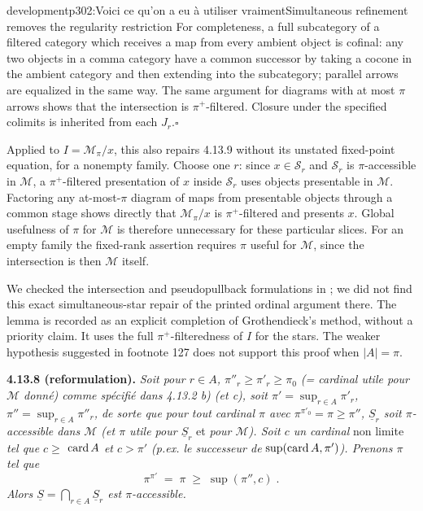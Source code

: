 \begin{dcomment}{development}{p302:Voici ce qu'on a eu à utiliser vraiment}{Simultaneous refinement removes the regularity restriction}
For completeness, a full subcategory of a filtered category which receives a map from every ambient object is cofinal: any two objects in a comma category have a common successor by taking a cocone in the ambient category and then extending into the subcategory; parallel arrows are equalized in the same way. The same argument for diagrams with at most $\pi$ arrows shows that the intersection is $\pi^+$-filtered. Closure under the specified colimits is inherited from each $J_r$.\hfill$\square$

Applied to $I=\mathcal M_\pi/x$, this also repairs 4.13.9 without its unstated fixed-point equation, for a nonempty family. Choose one $r$: since $x\in\mathcal S_r$ and $\mathcal S_r$ is $\pi$-accessible in $\mathcal M$, a $\pi^+$-filtered presentation of $x$ inside $\mathcal S_r$ uses objects presentable in $\mathcal M$. Factoring any at-most-$\pi$ diagram of maps from presentable objects through a common stage shows directly that $\mathcal M_\pi/x$ is $\pi^+$-filtered and presents $x$. Global usefulness of $\pi$ for $\mathcal M$ is therefore unnecessary for these particular slices. For an empty family the fixed-rank assertion requires $\pi$ useful for $\mathcal M$, since the intersection is then $\mathcal M$ itself.

We checked the intersection and pseudopullback formulations in \citet{Lurie2009HTT,ChornyRosicky2012,Positselski2024Limits}; we did not find this exact simultaneous-star repair of the printed ordinal argument there. The lemma is recorded as an explicit completion of Grothendieck's method, without a priority claim. It uses the full $\pi^+$-filteredness of $I$ for the stars. The weaker hypothesis suggested in footnote 127 does not support this proof when $|A|=\pi$.
\end{dcomment}


\textbf{4.13.8 (reformulation).} \textit{Soit pour $r\in A$, $\pi''_r\geqslant\pi'_r\geqslant\pi_0$ (= cardinal utile pour $\mathcal{M}$ donné) comme spécifié dans 4.13.2 b) (et c), soit $\pi'=\sup_{r\in A}\pi'_r$, $\pi''=\sup_{r\in A}\pi''_r$, de sorte que pour tout cardinal $\pi$ avec $\pi^{\pi'_0}=\pi\geqslant\pi''$, $\underline{S}_r$ soit $\pi$-accessible dans $\mathcal{M}$ (et $\pi$ utile pour $\underline{S}_r$} et \textit{pour $\mathcal{M}$). Soit $c$ un cardinal} non limite \textit{tel que $c\geqslant$} $\operatorname{card} A$ \textit{et $c>\pi'$ (p.ex. le successeur de} $\sup(\operatorname{card} A,\pi')$\textit{). Prenons $\pi$ tel que}
\[ \pi^{\pi'} \; = \; \pi \; \geqslant \; \sup(\pi'',c) \; . \]
\textit{Alors $\underline{S}=\bigcap_{r\in A}\underline{S}_r$ est $\pi$-accessible.}

